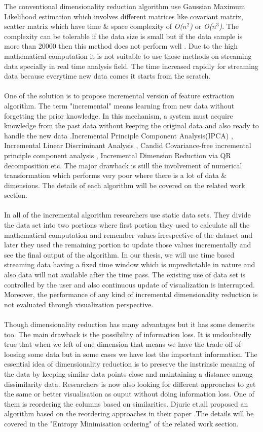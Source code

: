 The conventional dimensionality reduction algorithm use Gaussian Maximum Likelihood estimation which involves different matrices like covariant matrix, scatter matrix which have time \& space complexity of \textit{O($n^{2}$)} or \textit{O($n^{3}$)}. The complexity can be tolerable if the data size is small but if the data sample is more than 20000 then this method does not perform well \cite{p307}. Due to the high mathematical computation it is not suitable to use those methods on streaming data specially in real time analysis field. The time increased rapidly for streaming data because everytime new data comes it starts from the scratch.\\\\
One of the solution is to propose incremental version of feature extraction algorithm. The term "incremental" means learning from new data without forgetting the prior knowledge. In this mechanism, a system must acquire knowledge from the past data without keeping the original data and also ready to handle the new data \cite{p316}.Incremental Principle Component Analysis(IPCA) \cite{thesis4}, Incremental Linear Discriminant Analysis \cite{1thesis2}, Candid Covariance-free incremental principle component analysis \cite{thesis5}, Incremental Dimension Reduction via QR decomposition \cite{thesis2} etc. The major drawback is still the involvement of numerical transformation which performs very poor where there is a lot of data \& dimensions. The details of each algorithm will be covered on the related work section.\\\\
In all of the incremental algorithm researchers use static data sets. They divide the data set into two portions where first portion they used to calculate all the mathematical computation and remember values irrespective of the dataset and later they used the remaining portion to update those values incrementally and see the final output of the algorithm. In our thesis, we will use time based streaming data having a fixed time window which is unpredictable in nature and also data will not available after the time pass. The existing use of data set is controlled by the user and also continuous update of visualization is interrupted. Moreover, the performance of any kind of incremental dimensionality reduction is not evaluated through visualization perspective.\\\\
Though dimensionality reduction has many advantages but it has some demerits too. The main drawback is the possibility of information loss. It is undoubtedly true that when we left of one dimension that means we have the trade off of loosing some data but in some cases we have lost the important information. The essential idea of dimensionality reduction is to preserve the instrinsic meaning of the data by keeping similar data points close and maintaining a distance among dissimilarity data. Researchers is now also looking for different approaches to get the same or better visualisation as ouput without doing information loss. One of them is reordering the columns based on similarities. Djuric et.all proposed an algorithm based on the reordering approaches in their paper  \cite{1thesis3}.The details will be covered in the "Entropy Minimisation ordering" of the related work section.
